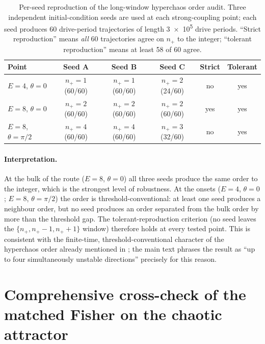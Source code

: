 \documentclass[Phys]{SciPost}
\begin{document}
\begin{table}[h]
  \centering
  \caption{Per-seed reproduction of the long-window hyperchaos order audit.
  Three independent initial-condition seeds are used at each strong-coupling
  point; each seed produces \num{60} drive-period trajectories of length
  \num{3e5} drive periods. ``Strict reproduction'' means \emph{all}
  \num{60} trajectories agree on $n_+$ to the integer; ``tolerant
  reproduction'' means at least \num{58} of \num{60} agree.}
  \label{SI-tab:per-seed}
  \begin{tabular}{@{}lccccc@{}}
    \toprule
    Point & Seed A & Seed B & Seed C & Strict & Tolerant \\
    \midrule
    $E=\num{4}$, $\theta=0$ & $n_+\!=\!1$ (60/60) & $n_+\!=\!1$ (60/60) & $n_+\!=\!2$ (24/60) & no & yes \\
    $E=\num{8}$, $\theta=0$ & $n_+\!=\!2$ (60/60) & $n_+\!=\!2$ (60/60) & $n_+\!=\!2$ (60/60) & yes & yes \\
    $E=\num{8}$, $\theta=\pi/2$ & $n_+\!=\!4$ (60/60) & $n_+\!=\!4$ (60/60) & $n_+\!=\!3$ (32/60) & no & yes \\
    \bottomrule
  \end{tabular}
\end{table}

\paragraph{Interpretation.}
At the bulk of the route ($E=\num{8}$, $\theta=0$) all three seeds produce
the same order to the integer, which is the strongest level of robustness.
At the onsets ($E=\num{4}$, $\theta=0$; $E=\num{8}$, $\theta=\pi/2$) the
order is threshold-conventional: at least one seed produces a neighbour
order, but no seed produces an order separated from the bulk order by more
than the threshold gap. The tolerant-reproduction criterion (no seed leaves
the $\{n_+,n_+-1,n_++1\}$ window) therefore holds at every tested point.
This is consistent with the finite-time, threshold-conventional character of
the hyperchaos order already mentioned in ; the main
text phrases the result as ``up to four simultaneously unstable
directions'' precisely for this reason.

\section{Comprehensive cross-check of the matched Fisher on the chaotic attractor}
\label{SI-sec:attractor-fisher-audit}
\end{document}
